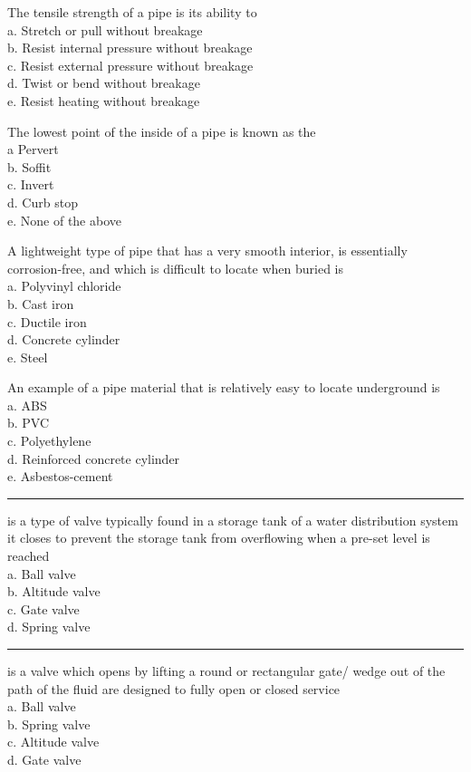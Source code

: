 The tensile strength of a pipe is its ability to\\ 
a.	Stretch or pull without breakage\\
b.	Resist internal pressure without breakage\\
c.	Resist external pressure without breakage\\
d.	Twist or bend without breakage\\
e.	Resist heating without breakage

The lowest point of the inside of a pipe is known as the\\
a	Pervert\\
b.	Soffit\\
c.	Invert\\
d.	Curb stop\\
e.	None of the above

A lightweight type of pipe that has a very smooth interior, is essentially corrosion-free, and which is difficult to locate when buried is\\
a.	Polyvinyl chloride\\
b.	Cast iron\\
c.	Ductile iron\\
d.	Concrete cylinder\\
e.	Steel

An example of a pipe material that is relatively easy to locate underground is\\
a.	ABS\\
b.	PVC\\
c.	Polyethylene\\
d.	Reinforced concrete cylinder\\
e.	Asbestos-cement

\rule{9mm}{.1pt} is a type of valve typically found in a storage tank of a water distribution system it closes to prevent the storage tank from overflowing when a pre-set level is reached\\

a.	Ball valve\\
b.	Altitude valve\\
c.	Gate valve\\
d.	Spring valve\\

\rule{9mm}{.1pt} is a valve which opens by lifting a round or rectangular gate/ wedge out of the path of the fluid are designed to fully open or closed service\\

a.	Ball valve\\
b.	Spring valve\\
c.	Altitude valve\\
d.	Gate valve\\

